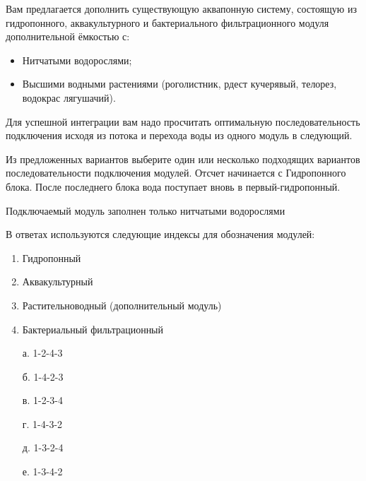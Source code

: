 
Вам предлагается дополнить существующую аквапонную систему, состоящую из гидропонного, аквакультурного и бактериального фильтрационного модуля дополнительной ёмкостью с:

\begin{itemize}
    \item Нитчатыми водорослями;
    \item Высшими водными растениями (роголистник, рдест кучерявый, телорез, водокрас лягушачий).
\end{itemize}

Для успешной интеграции вам надо просчитать оптимальную последовательность подключения исходя из потока и перехода воды из одного модуль в следующий.

Из предложенных вариантов выберите один или несколько подходящих вариантов последовательности подключения модулей. Отсчет начинается с Гидропонного блока. После последнего блока вода поступает вновь в первый-гидропонный.

Подключаемый модуль заполнен только нитчатыми водорослями

В ответах используются следующие индексы для обозначения модулей:

\begin{enumerate}
    \item Гидропонный
    \item Аквакультурный
    \item Растительноводный (дополнительный модуль)
    \item Бактериальный фильтрационный
\end{enumerate}

\begin{enumerate}
    \item[а.] 1-2-4-3
    \item[б.] 1-4-2-3
    \item[в.] 1-2-3-4
    \item[г.] 1-4-3-2
    \item[д.] 1-3-2-4
    \item[е.] 1-3-4-2
\end{enumerate}